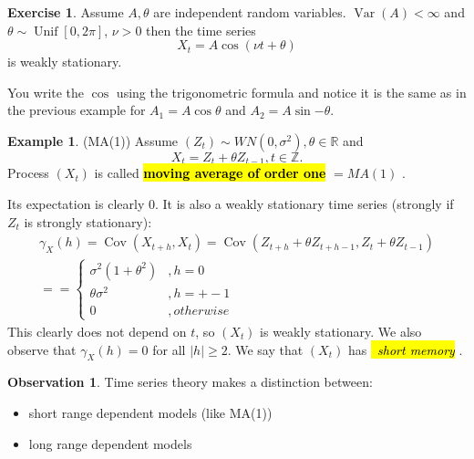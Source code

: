 \documentclass[12pt,a4paper, notitlepage]{book}
\newcommand{\hlc}[2][yellow]{ {\sethlcolor{#1} \hl{#2}} }
\newcommand{\hlcr}[1]{\hlc[lightred]{#1}}
\theoremstyle{definition} %
\newtheorem{example}[definition]{Example}
\newtheorem{exercise}[definition]{Exercise}
\newtheorem{observation}[definition]{Observation}
\theoremstyle{plain} %
\newcommand{\R}{\mathbb R}
\newcommand{\Z}{\mathbb Z}
\DeclareMathOperator{\Var}{Var}
\DeclareMathOperator{\Cov}{Cov}
\DeclareMathOperator{\Unif}{Unif}
\newcommand{\New}[1]{ {\bf \hlcr{#1} } }
\newcommand{\Important}[1]{ {\it \hlc{#1} } }
\begin{document}
\begin{exercise}
Assume $A, \theta$ are independent random variables. $\Var(A) < \infty$ and $\theta \sim \Unif[0,2\pi]$, $\nu > 0$ then the time series
\[ X_t = A \cos{( \nu t + \theta )} \] 
 is weakly stationary. 
\end{exercise}
\begin{hint}
You write the $\cos$ using the trigonometric formula and notice it is the same as in the previous example for 
$A_1 = A\cos{\theta}$ and $A_2 = A\sin{ - \theta}$.
\end{hint}

\begin{example} (MA(1))
Assume $(Z_t) \sim WN(0, \sigma^2), \theta \in \R$
and 
\[ X_t = Z_t + \theta Z_{t-1},  t \in \Z. \]
Process $(X_t)$ is called \New{ moving average of order one} $= MA(1)$ .

Its expectation is clearly $0$. It is also a weakly stationary time series (strongly if $Z_t$ is strongly stationary):
\begin{align*} \gamma_X(h) =  \Cov(X_{t + h}, X_t) =  \Cov(Z_{t+h} + \theta Z_{t+h-1}, Z_t + \theta Z_{t-1})  \\ = 
= \begin{cases} \sigma^2(1 + \theta^2)  &, h = 0 \\
	\theta \sigma^2	& , h = +-1 \\
		0	& , otherwise \end{cases}
\end{align*}
This clearly does not depend on $t$, so $(X_t)$ is weakly stationary. We also observe that $\gamma_X(h) = 0$ for all $|h| \geq 2$. We say that $(X_t)$ has \Important{\ short memory}.

\end{example}

\begin{observation}
Time series theory makes a distinction between:
\begin{itemize}
\item short range dependent models (like MA(1))
\item long range dependent models
\end{itemize}
\end{observation}
\end{document}
